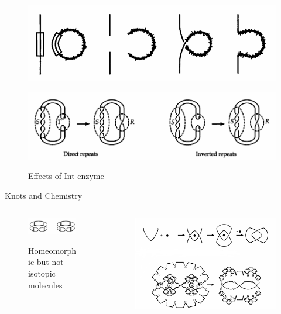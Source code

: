 \begin{frame}
\begin{figure}
    \centering
    \includegraphics[width=0.6\linewidth]{images/inten.png}
    \label{inten}
\end{figure}
\begin{figure}
    \centering
    \includegraphics[width=0.75\linewidth]{images/inten2.png}
    \caption{Effects of Int enzyme}
    \label{inten2}
    \cite{adams2004knot}
\end{figure}   
\end{frame}
\begin{frame}{Knots and Chemistry}
\begin{columns}[T]
\begin{column}{.48\textwidth}
\begin{figure}
    \centering
    \includegraphics[width=0.8\linewidth]{images/mobius.png}
    \caption{Homeomorphic but not isotopic \centering molecules}
    \label{mobius}
    \cite{adams2004knot}
\end{figure}
\end{column} 
\begin{column}{.48\textwidth}
\begin{figure}
    \centering
    \includegraphics[width=0.9\linewidth]{images/mergedmolecule.png}
    \label{merged}
    \cite{adams2004knot}
\end{figure}
\end{column}
\end{columns}
\end{frame}
